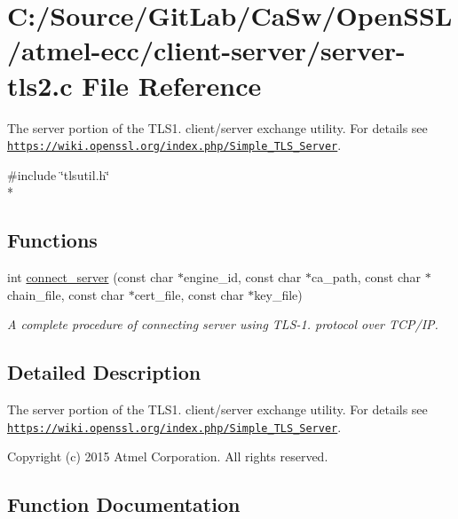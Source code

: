 \hypertarget{server-tls2_8c}{}\section{C\+:/\+Source/\+Git\+Lab/\+Ca\+Sw/\+Open\+S\+S\+L/atmel-\/ecc/client-\/server/server-\/tls2.c File Reference}
\label{server-tls2_8c}


The server portion of the T\+L\+S1. client/server exchange utility. For details see \href{https://wiki.openssl.org/index.php/Simple_TLS_Server}{\tt https\+://wiki.\+openssl.\+org/index.\+php/\+Simple\+\_\+\+T\+L\+S\+\_\+\+Server}.  


{\ttfamily \#include \char`\"{}tlsutil.\+h\char`\"{}}\\*
\subsection*{Functions}
\begin{DoxyCompactItemize}
\item 
int \hyperlink{server-tls2_8c_ac08479de4044117871d2b5ba30c8807f}{connect\+\_\+server} (const char $\ast$engine\+\_\+id, const char $\ast$ca\+\_\+path, const char $\ast$chain\+\_\+file, const char $\ast$cert\+\_\+file, const char $\ast$key\+\_\+file)
\begin{DoxyCompactList}\small\item\em A complete procedure of connecting server using T\+L\+S-\/1. protocol over T\+C\+P/\+I\+P. \end{DoxyCompactList}\end{DoxyCompactItemize}


\subsection{Detailed Description}
The server portion of the T\+L\+S1. client/server exchange utility. For details see \href{https://wiki.openssl.org/index.php/Simple_TLS_Server}{\tt https\+://wiki.\+openssl.\+org/index.\+php/\+Simple\+\_\+\+T\+L\+S\+\_\+\+Server}. 

Copyright (c) 2015 Atmel Corporation. All rights reserved.

\subsection{Function Documentation}
\hypertarget{server-tls2_8c_ac08479de4044117871d2b5ba30c8807f}{}
